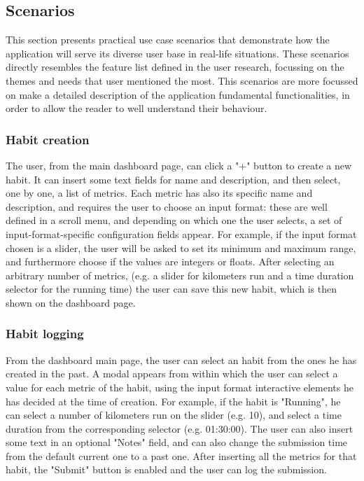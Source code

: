 \documentclass{article}
\begin{document}
\subsection{Scenarios}

This section presents practical use case scenarios that demonstrate how the application will serve its diverse user base in real-life situations.
These scenarios directly resembles the feature list defined in the user research, focussing on the themes and needs that user mentioned the most.
This scenarios are more focussed on make a detailed description of the application fundamental functionalities, in order to allow the reader to well understand their behaviour.

\subsubsection{Habit creation}

The user, from the main dashboard page, can click a "+" button to create a new habit.
It can insert some text fields for name and description, and then select, one by one, a list of metrics.
Each metric has also its specific name and description, and requires the user to choose an input format: these are well defined in a scroll menu, and depending on which one the user selects, a set of input-format-specific configuration fields appear.
For example, if the input format chosen is a slider, the user will be asked to set its minimum and maximum range, and furthermore choose if the values are integers or floats.
After selecting an arbitrary number of metrics, (e.g. a slider for kilometers run and a time duration selector for the running time) the user can save this new habit, which is then shown on the dashboard page.

\subsubsection{Habit logging}

From the dashboard main page, the user can select an habit from the ones he has created in the past.
A modal appears from within which the user can select a value for each metric of the habit, using the input format interactive elements he has decided at the time of creation.
For example, if the habit is "Running", he can select a number of kilometers run on the slider (e.g. 10), and select a time duration from the corresponding selector (e.g. 01:30:00).
The user can also insert some text in an optional "Notes" field, and can also change the submission time from the default current one to a past one.
After inserting all the metrics for that habit, the "Submit" button is enabled and the user can log the submission.
\end{document}
